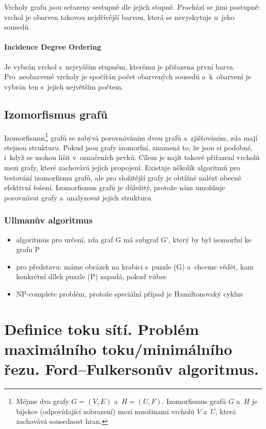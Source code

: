 Vrcholy grafu jsou seřazeny sestupně dle jejich stupně.
Prochází se jimi postupně: vrchol je obarven takovou nejdřívější barvou, která se nevyskytuje u~jeho sousedů.

\paragraph{Incidence Degree Ordering}

Je vybrán vrchol s~nejvyšším stupněm, kterému je přiřazena první barva.
Pro~neobarvené vrcholy je spočítán počet obarvených sousedů a~k~obarvení je vybrán ten s~jejich největším počtem.

\subsection{Izomorfismus grafů}

Izomorfismus\footnote{Mějme dva grafy $G = (V, E)$ a~$H = (U, F)$. Izomorfismus grafů $G$ a~$H$ je bijekce (odpovídající zobrazení) mezi množinami vrcholů $V$ a~$U$, která zachovává sousednost hran.
} grafů se zabývá porovnáváním dvou grafů a~zjišťováním, zda mají stejnou strukturu. Pokud jsou grafy izomorfní, znamená to, že jsou si podobné, i~když se mohou lišit v~označeních prvků. Cílem je najít takové přiřazení vrcholů mezi grafy, které zachovává jejich propojení. Existuje několik algoritmů pro testování izomorfismu grafů, ale pro složitější grafy je obtížné nalézt obecně efektivní řešení. Izomorfismus grafů je důležitý, protože nám umožňuje porovnávat grafy a~analyzovat jejich strukturu.



\subsubsection{Ullmanův algoritmus}
\begin{itemize}
    \item algoritmus pro určení, zda graf G má subgraf G', který by byl isomorfní ke grafu P
    \item pro představu: máme obrázek na krabici s~puzzle (G) a~chceme vědět, kam konkrétní dílek puzzle (P) zapadá, pokud vůbec
    \item NP-complete problém, protože speciální případ je Hamiltonovský cyklus
\end{itemize}

\clearpage
\section{Definice toku sítí. Problém maximálního toku/minimálního řezu. Ford--Fulkersonův algoritmus.}

